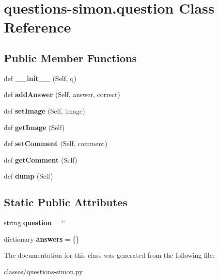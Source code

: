 \hypertarget{classquestions-simon_1_1question}{}\section{questions-\/simon.question Class Reference}
\label{classquestions-simon_1_1question}
\subsection*{Public Member Functions}
\begin{DoxyCompactItemize}
\item 
\mbox{\label{classquestions-simon_1_1question_ad81487e067da563aed36fd2fdf42fe99}} 
def {\bfseries \+\_\+\+\_\+init\+\_\+\+\_\+} (Self, q)
\item 
\mbox{\label{classquestions-simon_1_1question_af8dfc02000d09bd7408573c38b97de56}} 
def {\bfseries add\+Answer} (Self, answer, correct)
\item 
\mbox{\label{classquestions-simon_1_1question_abcab6d7d7f0e282314a3577dbbcf1a28}} 
def {\bfseries set\+Image} (Self, image)
\item 
\mbox{\label{classquestions-simon_1_1question_ad6d346c4b9ebdbd0ccf2cd93c1042126}} 
def {\bfseries get\+Image} (Self)
\item 
\mbox{\label{classquestions-simon_1_1question_a974643d89fa5caeb901ba799cae4bce1}} 
def {\bfseries set\+Comment} (Self, comment)
\item 
\mbox{\label{classquestions-simon_1_1question_a3fe81e28952d76e488aab9939567b008}} 
def {\bfseries get\+Comment} (Self)
\item 
\mbox{\label{classquestions-simon_1_1question_a87f633095bf96a8f88122821110c9ab8}} 
def {\bfseries dump} (Self)
\end{DoxyCompactItemize}
\subsection*{Static Public Attributes}
\begin{DoxyCompactItemize}
\item 
\mbox{\label{classquestions-simon_1_1question_ac82eef3a0c80e949ff36a0ab59a1165d}} 
string {\bfseries question} = \char`\"{}\char`\"{}
\item 
\mbox{\label{classquestions-simon_1_1question_a086ac1191ad5f1cf3b4fc1b60f93e838}} 
dictionary {\bfseries answers} = \{\}
\end{DoxyCompactItemize}


The documentation for this class was generated from the following file\+:\begin{DoxyCompactItemize}
\item 
classes/questions-\/simon.\+py\end{DoxyCompactItemize}
